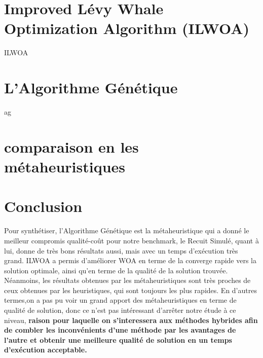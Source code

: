 \documentclass[12pt,a4paper, titlepage]{report}
\begin{document}
    \chapter{Improved Lévy Whale Optimization Algorithm (ILWOA)}
    {ILWOA}
    \chapter{L'Algorithme Génétique}
    {ag}
    \chapter{comparaison en les métaheuristiques}
    \chapter{Conclusion}
    Pour synthétiser, l’Algorithme Génétique est la métaheuristique qui a donné le meilleur compromis qualité-coût pour notre benchmark, le Recuit Simulé, quant à lui, donne de très bons résultats aussi, mais avec un temps d'exécution très grand. ILWOA a permis d’améliorer WOA en terme de la converge rapide vers la solution optimale, ainsi qu’en terme de la qualité de la solution trouvée. Néanmoins, les résultats obtenues par les métaheuristiques sont très proches de ceux obtenues par les heuristiques, qui sont toujours les plus rapides. En d’autres termes,on a pas pu voir un grand apport des métaheuristiques en terme de qualité de solution, donc ce n’est pas intéressant d’arrêter notre étude à ce niveau, \textbf{raison pour laquelle on s’interessera aux méthodes hybrides afin de combler les inconvénients d’une méthode par les avantages de l’autre et obtenir une meilleure qualité de solution en un temps d'exécution acceptable.}
    
\end{document}
